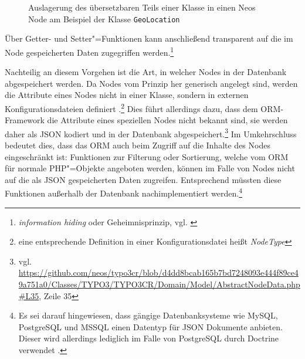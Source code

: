 \begin{figure}[ht!]
\begin{margincap}
\centering
{}
\caption{Auslagerung des übersetzbaren Teils einer Klasse in einen Neos Node am Beispiel der Klasse \texttt{GeoLocation}}
\label{img:ClassToNode}
\end{margincap}
\end{figure}

Über Getter- und Setter"=Funktionen kann anschließend transparent auf die im Node gespeicherten Daten zugegriffen werden.\footnote{\textit{information hiding} oder Geheimnisprinzip, vgl. \cite[S. 26]{Balzert.1999}}

Nachteilig an diesem Vorgehen ist die Art, in welcher Nodes in der Datenbank abgespeichert werden. Da Nodes vom Prinzip her generisch angelegt sind, werden die Attribute eines Nodes nicht in einer Klasse, sondern in externen Konfigurationsdateien definiert \cite[S. 16]{TheNeosTeam.2015b}.\footnote{eine entsprechende Definition in einer Konfigurationsdatei heißt \emph{NodeType}} Dies führt allerdings dazu, dass dem ORM-Framework die Attribute eines speziellen Nodes nicht bekannt sind, sie werden daher als JSON kodiert und in der Datenbank abgespeichert.\footnote{vgl. \url{https://github.com/neos/typo3cr/blob/d4dd8bcab165b7bd7248093e444f89ce49a751a0/Classes/TYPO3/TYPO3CR/Domain/Model/AbstractNodeData.php\#L35}, Zeile 35} Im Umkehrschluss bedeutet dies, dass das ORM auch beim Zugriff auf die Inhalte des Nodes eingeschränkt ist: Funktionen zur Filterung oder Sortierung, welche vom ORM für normale PHP"=Objekte angeboten werden, können im Falle von Nodes nicht auf die als JSON gespeicherten Daten zugreifen. Entsprechend müssten diese Funktionen außerhalb der Datenbank nachimplementiert werden.\footnote{Es sei darauf hingewiesen, dass gängige Datenbanksysteme wie MySQL, PostgreSQL und MSSQL einen Datentyp für JSON Dokumente anbieten. Dieser wird allerdings lediglich im Falle von PostgreSQL durch Doctrine verwendet \cite[vgl. 8.2 Mapping Types]{TheDoctrineProject.}.}

